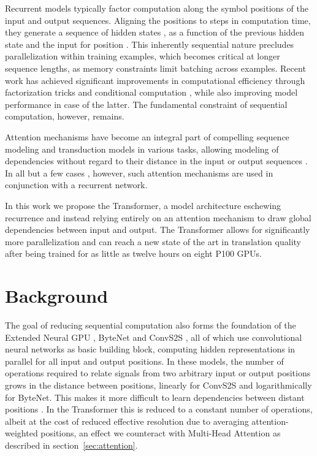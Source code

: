 \documentclass{article}
\begin{document}
Recurrent models typically factor computation along the symbol positions of the input and output sequences. Aligning the positions to steps in computation time, they generate a sequence of hidden states , as a function of the previous hidden state  and the input for position . This inherently sequential nature precludes parallelization within training examples, which becomes critical at longer sequence lengths, as memory constraints limit batching across examples.
Recent work has achieved significant improvements in computational efficiency through factorization tricks \citep{Kuchaiev2017Factorization} and conditional computation \citep{shazeer2017outrageously}, while also improving model performance in case of the latter. The fundamental constraint of sequential computation, however, remains.



Attention mechanisms have become an integral part of compelling sequence modeling and transduction models in various tasks, allowing modeling of dependencies without regard to their distance in the input or output sequences \citep{bahdanau2014neural, structuredAttentionNetworks}. In all but a few cases \citep{decomposableAttnModel}, however, such attention mechanisms are used in conjunction with a recurrent network.



In this work we propose the Transformer, a model architecture eschewing recurrence and instead relying entirely on an attention mechanism to draw global dependencies between input and output. The Transformer allows for significantly more parallelization and can reach a new state of the art in translation quality after being trained for as little as twelve hours on eight P100 GPUs. 


%
 
\section{Background}

The goal of reducing sequential computation also forms the foundation of the Extended Neural GPU \citep{extendedngpu}, ByteNet \citep{NalBytenet2017} and ConvS2S \citep{JonasFaceNet2017}, all of which use convolutional neural networks as basic building block, computing hidden representations in parallel for all input and output positions. In these models, the number of operations required to relate signals from two arbitrary input or output positions grows in the distance between positions, linearly for ConvS2S and logarithmically for ByteNet. This makes it more difficult to learn dependencies between distant positions \citep{hochreiter2001gradient}. In the Transformer this is reduced to a constant number of operations, albeit at the cost of reduced effective resolution due to averaging attention-weighted positions, an effect we counteract with Multi-Head Attention as described in section~\ref{sec:attention}. 
\end{document}
